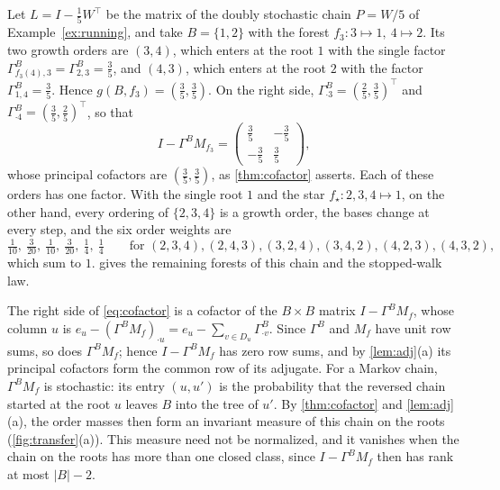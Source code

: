 \documentclass[onefignum,onetabnum]{siamart250211}
\numberwithin{theorem}{section}
\numberwithin{equation}{section}
\begin{document}
\begin{example}\label{ex:calc}
Let $L=I-\tfrac15W^{\top}$ be the matrix of the doubly stochastic
chain $P=W/5$ of Example~\ref{ex:running}, and take $B=\{1,2\}$ with the forest
$f_3:3\mapsto1,\ 4\mapsto2$. Its two growth orders are $(3,4)$, which
enters at the root $1$ with the single factor
$\Gamma^B_{f_3(4),3}=\Gamma^B_{2,3}=\tfrac35$, and $(4,3)$,
which enters at the root $2$ with the factor
$\Gamma^B_{1,4}=\tfrac35$. Hence $g(B,f_3)=(\tfrac35,\tfrac35)$. On
the right side, $\Gamma^B_{\cdot3}=(\tfrac25,\tfrac35)^{\top}$ and
$\Gamma^B_{\cdot4}=(\tfrac35,\tfrac25)^{\top}$, so that
\[
I-\Gamma^BM_{f_3}=\begin{pmatrix}\tfrac35&-\tfrac35\\[2pt]-\tfrac35&\tfrac35\end{pmatrix},
\]
whose principal cofactors are $(\tfrac35,\tfrac35)$, as
\cref{thm:cofactor} asserts. Each of these orders has one factor. With
the single root $1$ and the star $f_\star:2,3,4\mapsto1$, on the other
hand, every ordering of $\{2,3,4\}$ is a growth order, the bases change
at every step, and the six order weights are
\[
\tfrac1{10},\ \tfrac3{20},\ \tfrac1{10},\ \tfrac3{20},\ \tfrac14,\ \tfrac14
\qquad\text{for }(2,3,4),(2,4,3),(3,2,4),(3,4,2),(4,2,3),(4,3,2),
\]
which sum to $1$.  gives the remaining forests of
this chain and the stopped-walk law.
\end{example}
\begin{remark}\label{rem:reading}
The right side of \eqref{eq:cofactor} is a cofactor of the
$B\times B$ matrix $I-\Gamma^BM_f$, whose column $u$ is
$e_u-(\Gamma^BM_f)_{\cdot u}=e_u-\sum_{v\in D_u}\Gamma^B_{\cdot v}$.
Since $\Gamma^B$ and $M_f$ have unit row sums, so does $\Gamma^BM_f$;
hence $I-\Gamma^BM_f$ has zero row sums, and by \cref{lem:adj}(a) its
principal cofactors form the common row of its adjugate. For a Markov
chain, $\Gamma^BM_f$ is stochastic: its entry $(u,u')$ is the
probability that the reversed chain started at the root $u$ leaves $B$
into the tree of $u'$. By \cref{thm:cofactor} and \cref{lem:adj}(a),
the order masses then form an invariant measure of this chain on the
roots (\cref{fig:transfer}(a)). This measure need not be normalized, and
it vanishes when the chain on the roots has more than one closed class,
since $I-\Gamma^BM_f$ then has rank at most $|B|-2$.
\end{remark}
\end{document}
